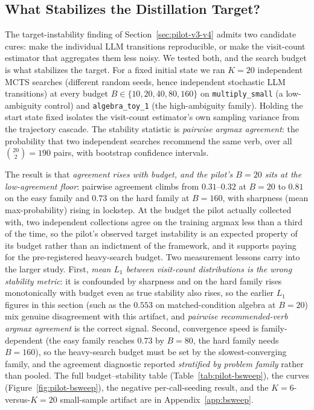 \subsection{What Stabilizes the Distillation Target?}
\label{sec:pilot-bsweep}

The target-instability finding of Section~\ref{sec:pilot-v3-v4} admits
two candidate cures: make the individual LLM transitions reproducible,
or make the visit-count estimator that aggregates them less noisy. We
tested both, and the search budget is what stabilizes the target. For a
fixed initial state we ran $K = 20$ independent MCTS searches (different
random seeds, hence independent stochastic LLM transitions) at every
budget $B \in \{10, 20, 40, 80, 160\}$ on \texttt{multiply\_small} (a
low-ambiguity control) and \texttt{algebra\_toy\_1} (the high-ambiguity
family). Holding the start state fixed isolates the visit-count
estimator's own sampling variance from the trajectory cascade. The
stability statistic is \emph{pairwise argmax agreement}: the probability
that two independent searches recommend the same verb, over all
$\binom{20}{2} = 190$ pairs, with bootstrap confidence intervals.

The result is that \emph{agreement rises with budget, and the pilot's
$B = 20$ sits at the low-agreement floor}: pairwise agreement climbs from
$0.31$--$0.32$ at $B = 20$ to $0.81$ on the easy family and $0.73$ on the
hard family at $B = 160$, with sharpness (mean max-probability) rising in
lockstep. At the budget the pilot actually collected with, two
independent collections agree on the training argmax less than a third of
the time, so the pilot's observed target instability is an expected
property of its budget rather than an indictment of the framework, and it
supports paying for the pre-registered heavy-search budget. Two
measurement lessons carry into the larger study. First, \emph{mean $L_1$
between visit-count distributions is the wrong stability metric}: it is
confounded by sharpness and on the hard family rises monotonically with
budget even as true stability also rises, so the earlier $L_1$ figures in
this section (such as the $0.553$ on matched-condition algebra at
$B = 20$) mix genuine disagreement with this artifact, and \emph{pairwise
recommended-verb argmax agreement} is the correct signal. Second,
convergence speed is family-dependent (the easy family reaches $0.73$ by
$B = 80$, the hard family needs $B = 160$), so the heavy-search budget
must be set by the slowest-converging family, and the agreement
diagnostic reported \emph{stratified by problem family} rather than
pooled. The full budget--stability table
(Table~\ref{tab:pilot-bsweep}), the curves (Figure~\ref{fig:pilot-bsweep}),
the negative per-call-seeding result, and the $K = 6$-versus-$K = 20$
small-sample artifact are in Appendix~\ref{app:bsweep}.

